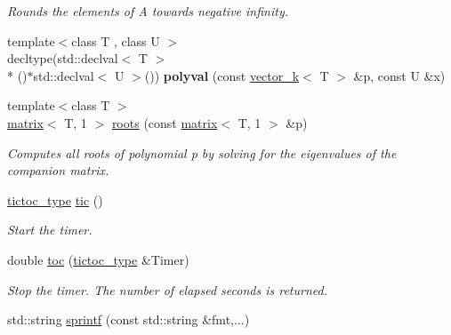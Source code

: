 \begin{DoxyCompactItemize}
\begin{DoxyCompactList}\small\item\em Rounds the elements of A towards negative infinity. \end{DoxyCompactList}\item 
\hypertarget{namespacekeycpp_ae7de6c3e5c495e91b1b1de7d716e7a5d}{{\footnotesize template$<$class T , class U $>$ }\\decltype(std\-::declval$<$ T $>$\\*
()$\ast$std\-::declval$<$ U $>$()) {\bfseries polyval} (const \hyperlink{classkeycpp_1_1vector__k}{vector\-\_\-k}$<$ T $>$ \&p, const U \&x)}\label{namespacekeycpp_ae7de6c3e5c495e91b1b1de7d716e7a5d}

\item 
\hypertarget{namespacekeycpp_a6232306d9f4271715e2dca51c1864939}{{\footnotesize template$<$class T $>$ }\\\hyperlink{classkeycpp_1_1matrix}{matrix}$<$ T, 1 $>$ \hyperlink{namespacekeycpp_a6232306d9f4271715e2dca51c1864939}{roots} (const \hyperlink{classkeycpp_1_1matrix}{matrix}$<$ T, 1 $>$ \&p)}\label{namespacekeycpp_a6232306d9f4271715e2dca51c1864939}

\begin{DoxyCompactList}\small\item\em Computes all roots of polynomial p by solving for the eigenvalues of the companion matrix. \end{DoxyCompactList}\item 
\hypertarget{namespacekeycpp_a6069a9eec0edfa1d401230013d98765e}{\hyperlink{structkeycpp_1_1tictoc__type}{tictoc\-\_\-type} \hyperlink{namespacekeycpp_a6069a9eec0edfa1d401230013d98765e}{tic} ()}\label{namespacekeycpp_a6069a9eec0edfa1d401230013d98765e}

\begin{DoxyCompactList}\small\item\em Start the timer. \end{DoxyCompactList}\item 
\hypertarget{namespacekeycpp_afe03fbbb5126729fb4b9367097acb1d1}{double \hyperlink{namespacekeycpp_afe03fbbb5126729fb4b9367097acb1d1}{toc} (\hyperlink{structkeycpp_1_1tictoc__type}{tictoc\-\_\-type} \&Timer)}\label{namespacekeycpp_afe03fbbb5126729fb4b9367097acb1d1}

\begin{DoxyCompactList}\small\item\em Stop the timer. The number of elapsed seconds is returned. \end{DoxyCompactList}\item 
\hypertarget{namespacekeycpp_a9d70a761d33bbc2bdec6b4e0eb43d517}{std\-::string \hyperlink{namespacekeycpp_a9d70a761d33bbc2bdec6b4e0eb43d517}{sprintf} (const std\-::string \&fmt,...)}\label{namespacekeycpp_a9d70a761d33bbc2bdec6b4e0eb43d517}


\end{DoxyCompactItemize}
